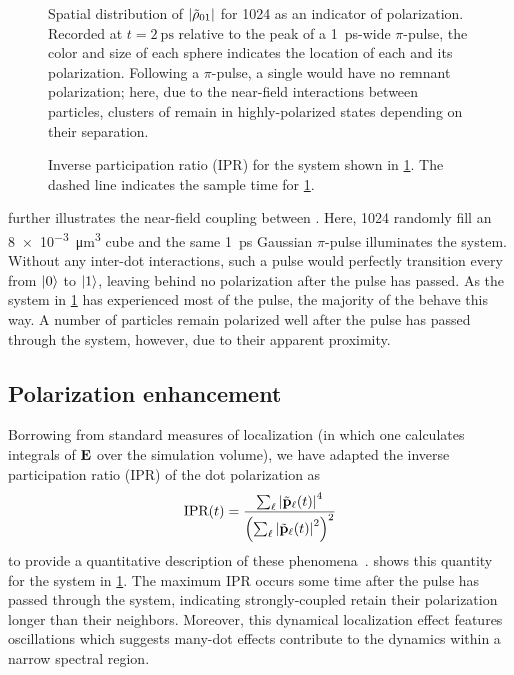 \begin{figure}
  \centering
  
  \caption{\label{fig:nearfield box}Spatial distribution of $\abs{\tilde{\rho}_{01}}$ for 1024 \qds{} as an indicator of polarization.
    Recorded at $t = \SI{2}{\pico\second}$ relative to the peak of a \SI{1}{\pico\second}-wide $\pi$-pulse, the color and size of each sphere indicates the location of each \qd{} and its polarization.
    Following a $\pi$-pulse, a single \qd{} would have no remnant polarization; here, due to the near-field interactions between particles, clusters of \qds{} remain in highly-polarized states depending on their separation.
  }
\end{figure}

\begin{figure}
  \centering
  
  \caption{\label{fig:ipr}Inverse participation ratio (IPR) for the system shown in \cref{fig:nearfield box}. The dashed line indicates the sample time for \cref{fig:nearfield box}.}
\end{figure}

 further illustrates the near-field coupling between \qds{}.
Here, 1024 \qds{} randomly fill an \SI{8e-3}{\micro\meter\cubed} cube and the same \SI{1}{\pico\second} Gaussian $\pi$-pulse illuminates the system.
Without any inter-dot interactions, such a pulse would perfectly transition every \qd{} from $\ket{0}$ to $\ket{1}$, leaving behind no polarization after the pulse has passed.
As the system in \cref{fig:nearfield box} has experienced most of the pulse, the majority of the \qds{} behave this way.
A number of particles remain polarized well after the pulse has passed through the system, however, due to their apparent proximity.

\subsection{Polarization enhancement}

Borrowing from standard measures of localization (in which one calculates integrals of $\vb{E}$ over the simulation volume), we have adapted the inverse participation ratio (IPR)  of the dot polarization as
\begin{equation}
  \text{IPR}(t) = \frac{\sum_\ell \abs{\tilde{\vb{p}}_\ell(t)}^4}{\qty(\sum_\ell \abs{\tilde{\vb{p}}_\ell(t)}^2)^2}
  \label{eq:ipr}
\end{equation}
to provide a quantitative description of these phenomena~\cite{Schwartz2007}.
 shows this quantity for the system in \cref{fig:nearfield box}.
The maximum IPR occurs some time after the pulse has passed through the system, indicating strongly-coupled \qds{} retain their polarization longer than their neighbors.
Moreover, this dynamical localization effect features oscillations which suggests many-dot effects contribute to the dynamics within a narrow spectral region.

